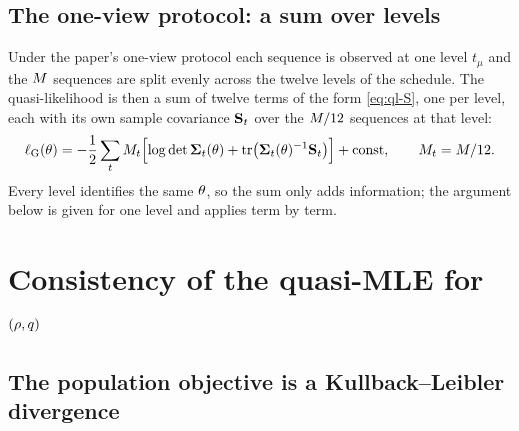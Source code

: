 \subsection{The one-view protocol: a sum over levels}

Under the paper's one-view protocol each sequence is observed at one level $t_\mu$ and the
$M$ sequences are split evenly across the twelve levels of the schedule. The
quasi-likelihood is then a sum of twelve terms of the form \cref{eq:ql-S}, one per level,
each with its own sample covariance $\mathbf{S}_t$ over the $M/12$ sequences at that
level:
\begin{equation}
  \ell_{\mathrm G}(\theta)=-\frac{1}{2}\sum_{t}M_t\Bigl[\log\det\mathbf{\Sigma}_t(\theta)+\operatorname{tr}\bigl(\mathbf{\Sigma}_t(\theta)^{-1}\mathbf{S}_t\bigr)\Bigr]+\text{const},
  \qquad M_t=M/12 .
  \label{eq:ql-levels}
\end{equation}
Every level identifies the same $\theta$, so the sum only adds information; the
argument below is given for one level and applies term by term.

\section{Consistency of the quasi-MLE for \texorpdfstring{$(\rho,q)$}{(rho, q)}}
\label{sec:ql-consistency}

\subsection{The population objective is a Kullback--Leibler divergence}

